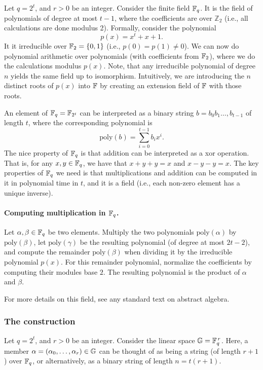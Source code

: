 Let $q = 2^t$, and $r>0$ be an integer. Consider the finite field
$\mathbb{F}_{q}$. It is the field of polynomials of degree at most $t-1$,
where the coefficients are over $\mathbb{Z}_2$ (i.e., all calculations
are done modulus 2).  Formally, consider the polynomial 
\[
p(x) = x^t + x +1.
\]
It it irreducible over $\mathbb{F}_2 =\left\{ {0,1} \right\}$ (i.e., $p(0) = p(1) \ne
0$). We can now do polynomial arithmetic over polynomials (with
coefficients from $\mathbb{F}_2$), where we do the calculations modulus
$p(x)$. Note, that any irreducible polynomial of degree $n$ yields the
same field up to isomorphism. Intuitively, we are introducing the $n$
distinct roots of $p(x)$ into $\mathbb{F}$ by creating an extension field
of $\mathbb{F}$ with those roots.


An element of $\mathbb{F}_q=\mathbb{F}_{2^t}$ can be interpreted as a binary
string $b = b_0b_1\ldots,b_{t-1}$ of length $t$, where the
corresponding polynomial is 
\[
\mathrm{poly}(b) =\sum_{i=0}^{t-1}
b_i x^i.
\]
The nice property of $\mathbb{F}_q$ is that addition can be interpreted as
a {\ttfamily x{o}r} operation. That is, for any $x,y \in \mathbb{F}_q$, we have
that $x+y+y = x$ and $x-y -y = x$. The key properties of $\mathbb{F}_q$ we
need is that multiplications and addition can be computed in it in
polynomial time in $t$, and it is a field (i.e., each non-zero element
has a unique inverse).

\paragraph{Computing multiplication in $\mathbb{F}_q$.}
Let $\alpha, \beta \in \mathbb{F}_q$ be two elements. Multiply the two polynomials
$\mathrm{poly}(\alpha)$ by $\mathrm{poly}(\beta)$, let
$\mathrm{poly}(\gamma)$ be the resulting polynomial (of degree at
most $2t-2$), and compute the remainder $\mathrm{poly}(\beta)$ when
dividing it by the irreducible polynomial $p(x)$. For this remainder
polynomial, normalize the coefficients by computing their modules base
$2$. The resulting polynomial is the product of $\alpha$ and $\beta$.

\bigskip


For more details on this field, see any standard text on abstract
algebra.


\subsubsection{The construction}


Let $q = 2^t$, and $r>0$ be an integer. Consider the linear space
$\mathbb{G} = \mathbb{F}_q^{\,r}$.  Here, a member $\alpha =
(\alpha_0,\ldots, \alpha_r) \in \mathbb{G}$ can be thought of as being a
string (of length $r+1$) over $\mathbb{F}_q$, or alternatively, as a
binary string of length $n=t(r+1)$.


